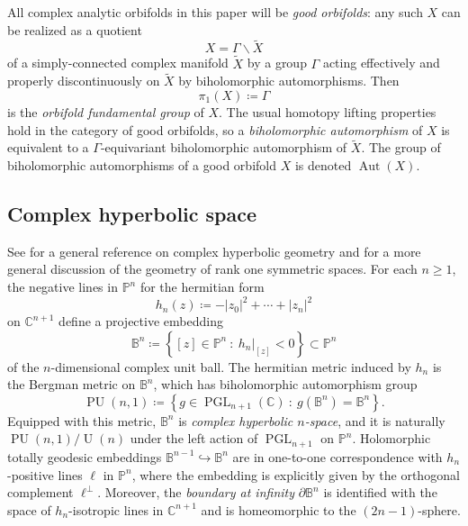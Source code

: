 \documentclass[11pt]{amsart}
\theoremstyle{plain}
\theoremstyle{definition}
\theoremstyle{remark}
\newcommand{\bbB}{\mathbb{B}}
\newcommand{\bbC}{\mathbb{C}}
\newcommand{\bbP}{\mathbb{P}}
\newcommand{\Gam}{\Gamma}
\DeclareMathOperator{\U}{U}
\DeclareMathOperator{\PGL}{PGL}
\DeclareMathOperator{\PU}{PU}
\DeclareMathOperator{\Aut}{Aut}
\newcommand{\bs}{\backslash}
\newcommand{\wt}{\widetilde}
\begin{document}
All complex analytic orbifolds in this paper will be \emph{good orbifolds}: any 
such $X$ can be realized as a quotient
	\[
	X = \Gam \bs \wt{X}
	\]
of a simply-connected complex manifold $\wt{X}$ by a group $\Gam$ acting effectively and properly discontinuously on $\wt{X}$ by biholomorphic automorphisms. Then
	\[
	\pi_1(X) \coloneqq \Gam
	\]
is the \emph{orbifold fundamental group} of $X$. The usual homotopy lifting properties hold in the category of good orbifolds, so a \emph{biholomorphic automorphism} of $X$ is equivalent to a $\Gam$-equivariant biholomorphic automorphism of $\wt{X}$. The group of biholomorphic automorphisms of a good orbifold $X$ is denoted $\Aut(X)$.

\subsection{Complex hyperbolic space}\label{backgroundcomplexhyp}

See \cite{zbMATH01270600} for a general reference on complex hyperbolic geometry and \cite[Ch.\ II.10]{zbMATH01385418} for a more general discussion of the geometry of rank one symmetric spaces. For each $n \ge 1$, the negative lines in $\bbP^n$ for the hermitian form
	\begin{equation}\label{eq:HermitianForm}
	h_n(z) \coloneqq -|z_0|^2 + \cdots + |z_n|^2
	\end{equation}
on $\bbC^{n+1}$ define a projective embedding
	\[
	\bbB^n \coloneqq \!\left\{[z] \in \bbP^n\ :\ h_n|_{[z]} < 0\right\}\! \subset\bbP^n
	\]
of the $n$-dimensional complex unit ball. The hermitian metric induced by $h_n$ is the Bergman metric on $\bbB^n$, which has biholomorphic automorphism group
	\[
	\PU(n,1)\coloneqq\!\left\{g \in \PGL_{n+1}(\bbC)\ :\ g(\bbB^n) = \bbB^n \right\}\!.
	\]
Equipped with this metric, $\bbB^n$ is \emph{complex hyperbolic $n$-space}, and it is naturally $\PU(n,1) / \U(n)$ under the left action of $\PGL_{n+1}$ on $\mathbb{P}^n$. Holomorphic totally geodesic embeddings $\bbB^{n-1}\hookrightarrow \bbB^n$ are in one-to-one correspondence with $h_n$-positive lines $\ell$ in $\bbP^n$, where the embedding is explicitly given by the orthogonal complement $\ell^\perp$. Moreover, the \emph{boundary at infinity} $\partial \bbB^n$ is identified with the space of $h_n$-isotropic lines in $\bbC^{n+1}$ and is homeomorphic to the $(2n-1)$-sphere.
\end{document}
